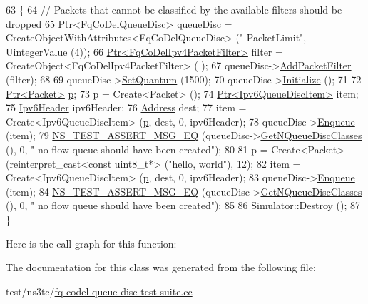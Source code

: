 \begin{DoxyCode}
63 \{
64   \textcolor{comment}{// Packets that cannot be classified by the available filters should be dropped}
65   \hyperlink{classns3_1_1Ptr}{Ptr<FqCoDelQueueDisc>} queueDisc = CreateObjectWithAttributes<FqCoDelQueueDisc> (\textcolor{stringliteral}{"
      PacketLimit"}, UintegerValue (4));
66   \hyperlink{classns3_1_1Ptr}{Ptr<FqCoDelIpv4PacketFilter>} filter = CreateObject<FqCoDelIpv4PacketFilter> (
      );
67   queueDisc->\hyperlink{classns3_1_1QueueDisc_a45efdc512f64cb8e0d57ad4f208ed4b7}{AddPacketFilter} (filter);
68 
69   queueDisc->\hyperlink{classns3_1_1FqCoDelQueueDisc_a3d7f222490f1df11be26ee4b3f0dfce5}{SetQuantum} (1500);
70   queueDisc->\hyperlink{classns3_1_1Object_af4411cb29971772fcd09203474a95078}{Initialize} ();
71 
72   \hyperlink{classns3_1_1Ptr}{Ptr<Packet>} \hyperlink{lte__link__budget_8m_ac9de518908a968428863f829398a4e62}{p};
73   p = Create<Packet> ();
74   \hyperlink{classns3_1_1Ptr}{Ptr<Ipv6QueueDiscItem>} item;
75   \hyperlink{classns3_1_1Ipv6Header}{Ipv6Header} ipv6Header;
76   \hyperlink{classns3_1_1Address}{Address} dest;
77   item = Create<Ipv6QueueDiscItem> (\hyperlink{lte__link__budget_8m_ac9de518908a968428863f829398a4e62}{p}, dest, 0, ipv6Header);
78   queueDisc->\hyperlink{classns3_1_1QueueDisc_af452fb01b98fed312125163f1fe85431}{Enqueue} (item);
79   \hyperlink{group__testing_ga2a9d78cffb3db8e867c35fff0b698cf5}{NS\_TEST\_ASSERT\_MSG\_EQ} (queueDisc->\hyperlink{classns3_1_1QueueDisc_a8165c6afde992b073bc4d3bb283ed138}{GetNQueueDiscClasses} (), 0, \textcolor{stringliteral}{"
      no flow queue should have been created"});
80 
81   p = Create<Packet> (\textcolor{keyword}{reinterpret\_cast<}\textcolor{keyword}{const }uint8\_t*\textcolor{keyword}{>} (\textcolor{stringliteral}{"hello, world"}), 12);
82   item = Create<Ipv6QueueDiscItem> (\hyperlink{lte__link__budget_8m_ac9de518908a968428863f829398a4e62}{p}, dest, 0, ipv6Header);
83   queueDisc->\hyperlink{classns3_1_1QueueDisc_af452fb01b98fed312125163f1fe85431}{Enqueue} (item);
84   \hyperlink{group__testing_ga2a9d78cffb3db8e867c35fff0b698cf5}{NS\_TEST\_ASSERT\_MSG\_EQ} (queueDisc->\hyperlink{classns3_1_1QueueDisc_a8165c6afde992b073bc4d3bb283ed138}{GetNQueueDiscClasses} (), 0, \textcolor{stringliteral}{"
      no flow queue should have been created"});
85 
86   Simulator::Destroy ();
87 \}
\end{DoxyCode}


Here is the call graph for this function\+:




The documentation for this class was generated from the following file\+:\begin{DoxyCompactItemize}
\item 
test/ns3tc/\hyperlink{fq-codel-queue-disc-test-suite_8cc}{fq-\/codel-\/queue-\/disc-\/test-\/suite.\+cc}\end{DoxyCompactItemize}
